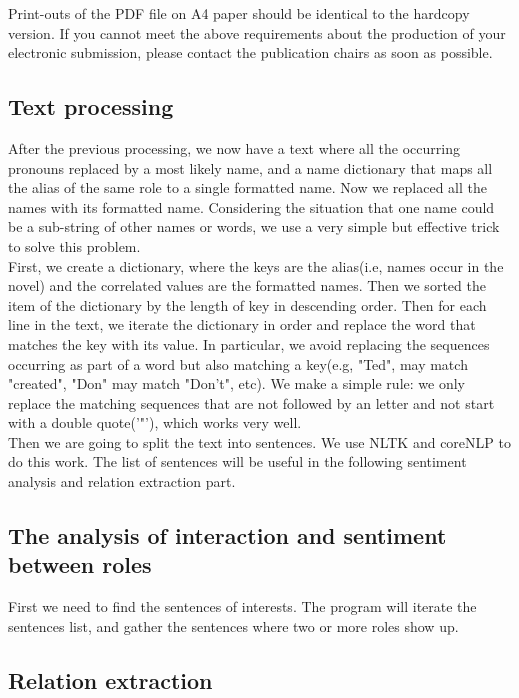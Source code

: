 \documentclass[11pt]{article}
\begin{document}
Print-outs of the PDF file on A4 paper should be identical to the
hardcopy version. If you cannot meet the above requirements about the
production of your electronic submission, please contact the
publication chairs as soon as possible.


\subsection{Text processing} %
\label{ssec:layout}

After the previous processing, we now have a text where all the occurring pronouns replaced by a most likely name, and a name dictionary that maps all the alias of the same role to a single formatted name. Now we replaced all the names with its formatted name. Considering the situation that one name could be a sub-string of other names or words, we use a very simple but effective trick to solve this problem. \\
First, we create a dictionary, where the keys are the alias(i.e, names occur in the novel) and the correlated values are the formatted names. Then we sorted the item of the dictionary by the length of key in descending order. Then for each line in the text, we iterate the dictionary in order and replace the word that matches the key with its value. In particular, we avoid replacing the sequences occurring as part of a word but also matching a key(e.g, "Ted", may match "created", "Don" may match "Don't", etc). We make a simple rule: we only replace the matching sequences that are not followed by an letter and not start with a double quote('"'), which works very well. \\ 

Then we are going to split the text into sentences. We use NLTK and coreNLP to do this work. The list of sentences will be useful in the following sentiment analysis and relation extraction part.

\subsection{The analysis of interaction and sentiment between roles} %
First we need to find the sentences of interests. The program will iterate the sentences list, and gather the sentences where two or more roles show up.

\subsection{Relation extraction} %
\label{ssec:first}
\end{document}
